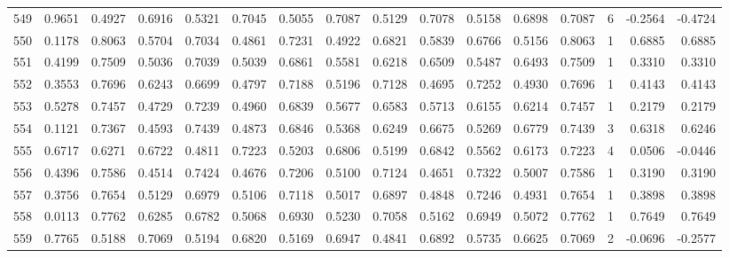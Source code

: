 \begin{tabular}{lrrrrrrrrrrrrrrr}
549 &      0.9651 &  0.4927 &  0.6916 &  0.5321 &  0.7045 &  0.5055 &  0.7087 &  0.5129 &  0.7078 &  0.5158 &   0.6898 &     0.7087 &      6 &                   -0.2564 &                    -0.4724 \\
550 &      0.1178 &  0.8063 &  0.5704 &  0.7034 &  0.4861 &  0.7231 &  0.4922 &  0.6821 &  0.5839 &  0.6766 &   0.5156 &     0.8063 &      1 &                    0.6885 &                     0.6885 \\
551 &      0.4199 &  0.7509 &  0.5036 &  0.7039 &  0.5039 &  0.6861 &  0.5581 &  0.6218 &  0.6509 &  0.5487 &   0.6493 &     0.7509 &      1 &                    0.3310 &                     0.3310 \\
552 &      0.3553 &  0.7696 &  0.6243 &  0.6699 &  0.4797 &  0.7188 &  0.5196 &  0.7128 &  0.4695 &  0.7252 &   0.4930 &     0.7696 &      1 &                    0.4143 &                     0.4143 \\
553 &      0.5278 &  0.7457 &  0.4729 &  0.7239 &  0.4960 &  0.6839 &  0.5677 &  0.6583 &  0.5713 &  0.6155 &   0.6214 &     0.7457 &      1 &                    0.2179 &                     0.2179 \\
554 &      0.1121 &  0.7367 &  0.4593 &  0.7439 &  0.4873 &  0.6846 &  0.5368 &  0.6249 &  0.6675 &  0.5269 &   0.6779 &     0.7439 &      3 &                    0.6318 &                     0.6246 \\
555 &      0.6717 &  0.6271 &  0.6722 &  0.4811 &  0.7223 &  0.5203 &  0.6806 &  0.5199 &  0.6842 &  0.5562 &   0.6173 &     0.7223 &      4 &                    0.0506 &                    -0.0446 \\
556 &      0.4396 &  0.7586 &  0.4514 &  0.7424 &  0.4676 &  0.7206 &  0.5100 &  0.7124 &  0.4651 &  0.7322 &   0.5007 &     0.7586 &      1 &                    0.3190 &                     0.3190 \\
557 &      0.3756 &  0.7654 &  0.5129 &  0.6979 &  0.5106 &  0.7118 &  0.5017 &  0.6897 &  0.4848 &  0.7246 &   0.4931 &     0.7654 &      1 &                    0.3898 &                     0.3898 \\
558 &      0.0113 &  0.7762 &  0.6285 &  0.6782 &  0.5068 &  0.6930 &  0.5230 &  0.7058 &  0.5162 &  0.6949 &   0.5072 &     0.7762 &      1 &                    0.7649 &                     0.7649 \\
559 &      0.7765 &  0.5188 &  0.7069 &  0.5194 &  0.6820 &  0.5169 &  0.6947 &  0.4841 &  0.6892 &  0.5735 &   0.6625 &     0.7069 &      2 &                   -0.0696 &                    -0.2577 \\

\end{tabular}
